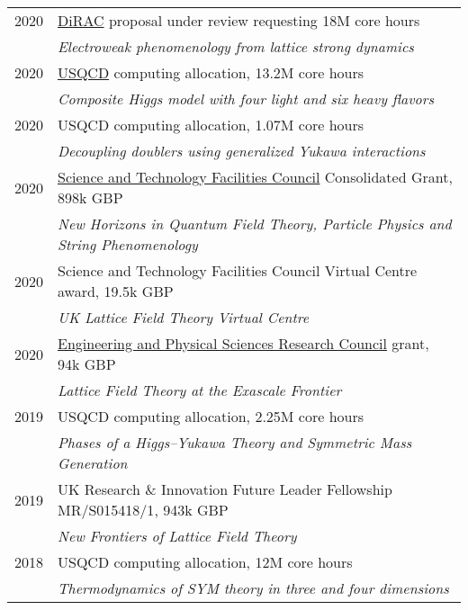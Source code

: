 \documentclass[10 pt]{article}
\begin{document}
\vspace{-12 pt} %
\begin{tabular}[t]{cl}
  2020 & \href{https://dirac.ac.uk}{DiRAC} proposal under review requesting 18M core hours                    \\ %
       & \textit{Electroweak phenomenology from lattice strong dynamics}                                      \\[6 pt]
  2020 & \href{http://www.usqcd.org}{USQCD} computing allocation, 13.2M core hours                            \\ %
       & \textit{Composite Higgs model with four light and six heavy flavors}                                 \\[6 pt]
  2020 & USQCD computing allocation, 1.07M core hours                                                         \\ %
       & \textit{Decoupling doublers using generalized Yukawa interactions}                                   \\[6 pt]
  2020 & \href{https://stfc.ukri.org}{Science and Technology Facilities Council} Consolidated Grant, 898k GBP \\
       & \textit{New Horizons in Quantum Field Theory, Particle Physics and String Phenomenology}             \\[6 pt]
  2020 & Science and Technology Facilities Council Virtual Centre award, 19.5k GBP                            \\
       & \textit{UK Lattice Field Theory Virtual Centre}                                                      \\[6 pt]
  2020 & \href{https://epsrc.ukri.org}{Engineering and Physical Sciences Research Council} grant, 94k GBP     \\
       & \textit{Lattice Field Theory at the Exascale Frontier}                                               \\[6 pt]
  2019 & USQCD computing allocation, 2.25M core hours                                                         \\ %
       & \textit{Phases of a Higgs--Yukawa Theory and Symmetric Mass Generation}                              \\[6 pt]
  2019 & UK Research \& Innovation Future Leader Fellowship {MR/S015418/1}, 943k GBP                          \\
       & \textit{New Frontiers of Lattice Field Theory}                                                       \\[6 pt]
  2018 & USQCD computing allocation, 12M core hours                                                           \\ %
       & \textit{Thermodynamics of SYM theory in three and four dimensions}                                   \\
\end{tabular}
\end{document}
